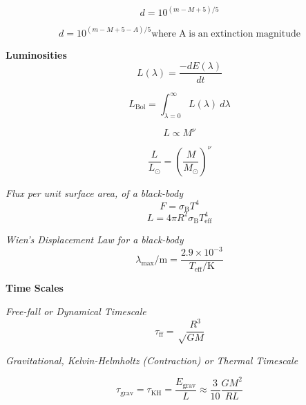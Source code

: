\documentclass{spy}
\begin{document}
\begin{equation}
d = 10^{(m-M+5)/5}
\end{equation}

\begin{equation}
d = 10^{(m-M+5-A)/5} \mathrm{where \; A \; is \; an \; extinction \; magnitude}
\end{equation}

\textbf {Luminosities}
\begin{equation}
L(\lambda) = \frac {-dE(\lambda)}{dt}
\end{equation}

\begin{equation}
L_\mathrm{Bol} = \int_{\lambda = 0}^{\infty} L(\lambda)\ d\lambda
\end{equation}

\begin{equation}
L \propto M^\nu
\end{equation}

\begin{equation}
\frac {L}{L_\odot} = \left(\frac {M}{M_\odot}\right)^\nu
\end{equation}
\begin{center}
\end{center}

\textit{Flux per unit surface area, of a black-body}
\begin{equation}
F = \sigma_\mathrm{B} T^4
\end{equation}
\begin{equation}
L = 4 \pi R^2 \sigma_\mathrm{B} T^4_\mathrm{eff}
\end{equation}

\textit{Wien's Displacement Law for a black-body}
\begin{equation}
\lambda_\mathrm{max}/\mathrm{m} = \frac{2.9 \times 10^{-3}}{T_\mathrm{eff}/\mathrm{K}}
\end{equation}

\textbf {Time Scales}

\textit {Free-fall or Dynamical Timescale}
\begin{equation}
\tau_\mathrm{ff} = \sqrt \frac {R^3}{G M}
\end{equation}

\textit {Gravitational, Kelvin-Helmholtz (Contraction) or Thermal Timescale}

\begin{equation}
\tau_\mathrm{grav} = \tau_\mathrm{KH} = \frac {E_\mathrm{grav}}{L} \approx \frac{3}{10} \frac{G M^2}{R L}
\end{equation}
\end{document}
